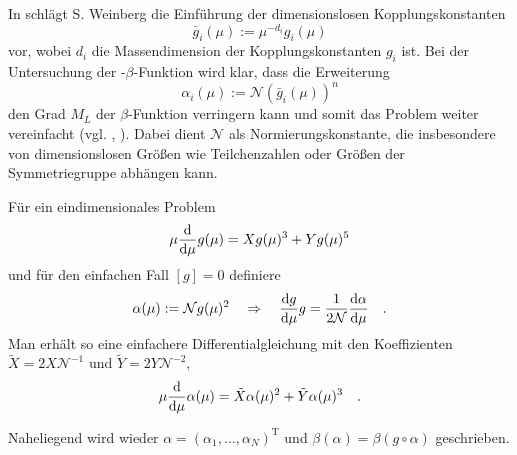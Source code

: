       In \cite{GR_Weinberg} schlägt S. Weinberg die Einführung der 
      dimensionslosen Kopplungskonstanten\begin{equation}
       \bar{g}_i(\mu):= \mu^{-d_i} g_i(\mu)
      \end{equation}
      vor, wobei $d_i$ die Massendimension der Kopplungskonstanten $g_i$ ist. 
      Bei der Untersuchung der \QCDxdQCD-$\beta$-Funktion wird klar, dass die 
      Erweiterung 
      \begin{equation}
       \alpha_i(\mu):= \mathcal{N} \left(\bar{g}_i(\mu)\right)^n
      \end{equation}
      den Grad $M_L$ der $\beta$-Funktion verringern kann und somit das Problem 
      weiter vereinfacht 
      (vgl. \cite{Scale_of_dark_QCD}, \cite{Asymptotic_safety_guaranteed}). 
      Dabei dient $\mathcal{N}$ als Normierungskonstante, die insbesondere von 
      dimensionslosen Größen wie Teilchenzahlen oder Größen der Symmetriegruppe 
      abhängen kann.
      \begin{beispiel}
	  Für ein eindimensionales Problem
	  \begin{equation}
	  \mu \frac{\text{d}}{\text{d} \mu} g(\mu) = X g(\mu)^3 + Y g(\mu)^5
	  \end{equation}
	  und für den einfachen Fall $[g]=0$ definiere 
	  \begin{equation}
	  \alpha(\mu) := \mathcal{N} g(\mu)^2 \quad \Rightarrow \quad  
	  \frac{\text{d} g}{\text{d} \mu} g=\frac{1}{2\mathcal{N}} 
	  \frac{\text{d} \alpha}{\text{d} \mu} \quad .
	\end{equation}
	Man erhält so eine einfachere Differentialgleichung mit den 
	Koeffizienten \\$\tilde{X}=2X\mathcal{N}^{-1}$ und 
	$\tilde{Y}=2Y\mathcal{N}^{-2}$,
	 \begin{equation}
	  \mu \frac{\text{d}}{\text{d} \mu} \alpha(\mu) =\tilde{X}\alpha(\mu)^2+\tilde{Y}
	  \alpha(\mu)^3 \quad .
	\end{equation}
	
    \end{beispiel}
    Naheliegend wird wieder $\alpha=(\alpha_1,\ldots,\alpha_N)^\text{T}$ und 
    $\beta(\alpha)=\beta(g\circ\alpha)$ geschrieben.
    
